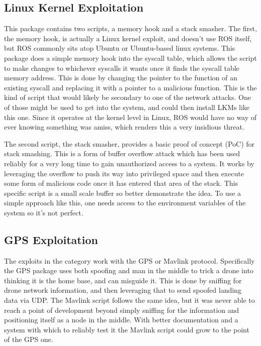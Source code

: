\documentclass[IEEEtran,letterpaper,10pt,notitlepage,draftclsnofoot,onecolumn]{article}
\begin{document}
\subsection{Linux Kernel Exploitation}
This package contains two scripts, a memory hook and a stack smasher.
The first, the memory hook, is actually a Linux kernel exploit, and doesn't use ROS itself, but ROS commonly sits atop Ubuntu or Ubuntu-based linux systems.
This package does a simple memory hook into the syscall table, which allows the script to make changes to whichever syscalls it wants once it finds the syscall table memory address.
This is done by changing the pointer to the function of an existing syscall and replacing it with a pointer to a malicious function.
This is the kind of script that would likely be secondary to one of the network attacks. One of those might be used to get into the system, and could then install LKMs like this one. Since it operates at the kernel level in Linux, ROS would have no way of ever knowing something was amiss, which renders this a very insidious threat.

The second script, the stack smasher, provides a basic proof of concept (PoC) for stack smashing.
This is a form of buffer overflow attack which has been used reliably for a very long time to gain unauthorized access to a system.
It works by leveraging the overflow to push its way into privileged space and then execute some form of malicious code once it has entered that area of the stack.
This specific script is a small scale buffer so better demonstrate the idea.
To use a simple approach like this, one needs access to the environment variables of the system so it's not perfect.

\subsection{GPS Exploitation}
The exploits in the category work with the GPS or Mavlink protocol.
Specifically the GPS package uses both spoofing and man in the middle to trick a drone into thinking it is the home base, and can misguide it.
This is done by sniffing for drone network information, and then leveraging that to send spoofed landing data via UDP.
The Mavlink script follows the same idea, but it was never able to reach a point of development beyond simply sniffing for the information and positioning itself as a node in the middle.
With better documentation and a system with which to reliably test it the Mavlink script could grow to the point of the GPS one.
\end{document}
